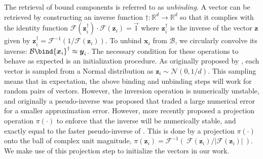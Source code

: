 \documentclass[letterpaper]{article} %
\begin{document}
The retrieval of bound components is referred to as \emph{unbinding}. A vector can be retrieved by constructing an inverse function $\dagger: \mathbb{R}^d \to \mathbb{R}^d$ so that it complies with the identity function $\mathcal{F}(\boldsymbol{z}_{i}^{\dagger}) \cdot \mathcal{F}(\boldsymbol{z}_i) = \vec{1}$ where $\boldsymbol{z}^{\dagger}_i$ is the inverse of the vector $\boldsymbol{z}$ given 
by $\boldsymbol{z}^{\dagger}_i = \mathcal{F}^{-1} \left( 1/\mathcal{F}(\boldsymbol{z}_i) \right)$.
To unbind $\boldsymbol{x}_i$ from $\mathcal{B}$, we circularly convolve its inverse: $\mathcal{B} \bind {\boldsymbol{x}_i}^\dagger \approx \boldsymbol{y}_i$. The necessary condition for these operations to behave as expected is an initialization procedure. As originally proposed by \cite{b2}, each vector is sampled from a Normal distribution as $\boldsymbol{z}_i \sim \mathcal{N}(0, 1/d)$. This sampling means that in expectation, the above binding and unbinding steps will work for random pairs of vectors. However, the inversion operation is numerically unstable, and originally a pseudo-inverse was proposed that traded a large numerical error for a smaller approximation error. However, more recently \cite{b3} proposed a projection operation $\pi(\cdot)$ to enforce that the inverse will be numerically stable, and exactly equal to the faster pseudo-inverse of \cite{b2}. This is done by a projection $\pi(\cdot)$ onto the ball of complex unit magnitude, $\pi(\boldsymbol{z}_i) = \mathcal{F}^{-1} \left(\: {\mathcal{F}(\boldsymbol{z}_i)}/{|\mathcal{F}(\boldsymbol{z}_i)|} \:\right)$.
We make use of this projection step to initialize the vectors in our work.
\end{document}
